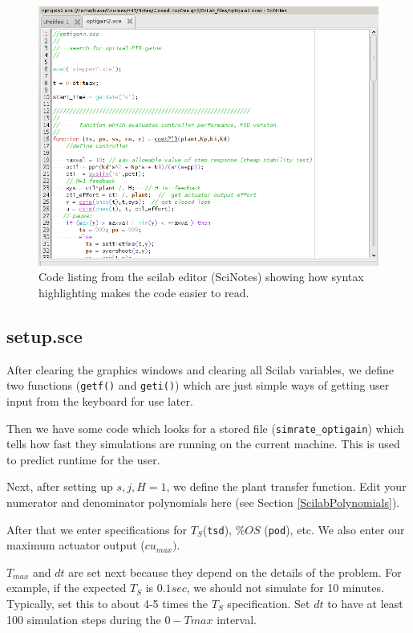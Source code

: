 \begin{figure}\centering
\includegraphics[width=4.75in]{figs09/sce_listing.png}
\caption{Code listing from the scilab editor (SciNotes) showing how syntax highlighting makes the code easier to read.}\label{syntax}
\end{figure}




\subsection{setup.sce}
After clearing the graphics windows and clearing all Scilab variables, we define two functions ({\tt getf()} and {\tt geti()}) which are just simple ways of getting user input from the keyboard for use later.

Then we have some code which looks for a stored file ({\tt simrate\_optigain}) which tells how fast they simulations are running on the current machine.  This is used to predict runtime for the user.

Next, after setting up $s, j, H=1$, we define the plant transfer function.  Edit your numerator and denominator polynomials here (see Section \ref{ScilabPolynomials}).

After that
we enter specifications for $T_S$({\tt tsd}), $\%OS$ ({\tt pod}), etc.   We also enter our maximum actuator output ($cu_{max})$.

$T_{max}$ and $dt$ are set next because they depend on the details of the problem.  For example, if the expected $T_S$ is $0.1sec$, we should not simulate for 10 minutes.   Typically, set this to about 4-5 times the $T_S$ specification.   Set $dt$ to have at least 100 simulation steps during the $0-T{max}$ interval.


